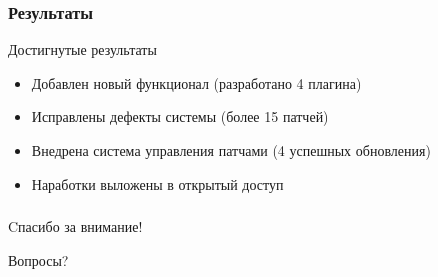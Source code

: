 \documentclass[unicode]{beamer}
\begin{document}
\begin{frame}
\transwipe[direction=90]
\frametitle{Результаты}
\begin{block}{Достигнутые результаты}
\begin{itemize}
  \item Добавлен новый функционал  (разработано 4 плагина)
  \item Исправлены дефекты системы (более 15 патчей)
  \item Внедрена система управления патчами (4 успешных обновления)
  \item Наработки выложены в открытый доступ 
\end{itemize}
\end{block}
\end{frame}

\begin{frame}
\transwipe[direction=90]
\frametitle{}
\centerline{\large{Cпасибо за внимание!}}
\hspace{2cm}
\centerline{\huge{Вопросы?}}
\end{frame}
\end{document}
